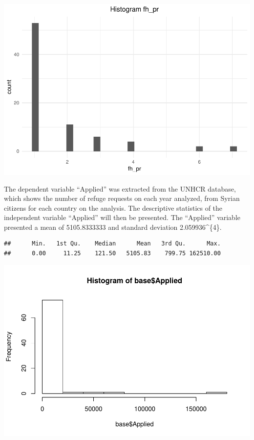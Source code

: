\documentclass[]{elsarticle} %
\makeatletter
\def\maxwidth{\ifdim\Gin@nat@width>\linewidth\linewidth
\else\Gin@nat@width\fi}
\let\Oldincludegraphics\includegraphics
\renewcommand{\includegraphics}[1]{\Oldincludegraphics[width=\maxwidth]{#1}}
\makeatother
\begin{document}
\includegraphics{refugees-stephanie_files/figure-latex/ggplot_variables-4.pdf}

The dependent variable ``Applied'' was extracted from the UNHCR
database, which shows the number of refuge requests on each year
analyzed, from Syrian citizens for each country on the analysis. The
descriptive statistics of the independent variable ``Applied'' will then
be presented. The ``Applied'' variable presented a mean of 5105.8333333
and standard deviation 2.059936\^{}\{4\}.

\begin{verbatim}
##      Min.   1st Qu.    Median      Mean   3rd Qu.      Max. 
##      0.00     11.25    121.50   5105.83    799.75 162510.00
\end{verbatim}

\includegraphics{refugees-stephanie_files/figure-latex/histo_1-1.pdf}
\end{document}
